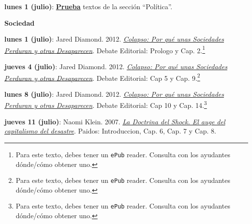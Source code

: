\documentclass[letterpaper]{article}
\renewenvironment{itemize}{
  \begin{list}{}{
    \setlength{\leftmargin}{1.5em}
  }
}{
  \end{list}
}
\begin{document}
\begin{enumerate}
\begin{itemize}
    \vspace{0.4cm}

		\item[\Pointinghand] {\bf lunes 1 (julio)}: {\bf \underline{Prueba}} textos de la secci\'on ``Pol\'itica''.
 
    \end{itemize}

\item {\bf Sociedad}

\begin{itemize}
		
		\item {\bf lunes 1 (julio)}: Jared Diamond. 2012. \href{https://github.com/hbahamonde/Intro_Ciencias_Sociales/raw/master/Readings/Diamond_Colapso_sociedades_perduran_desaparecen.epub}{\emph{Colapso: Por qu\'e unas Sociedades Perduran y otras Desaparecen}}. Debate Editorial: Prologo y Cap. 2.\footnote{Para este texto, debes tener un {\color{blue}\texttt{ePub}} reader. Consulta con los ayudantes d\'onde/c\'omo obtener uno.}

    \vspace{0.2cm}


		\item {\bf jueves 4 (julio)}: Jared Diamond. 2012. \href{https://github.com/hbahamonde/Intro_Ciencias_Sociales/raw/master/Readings/Diamond_Colapso_sociedades_perduran_desaparecen.epub}{\emph{Colapso: Por qu\'e unas Sociedades Perduran y otras Desaparecen}}. Debate Editorial: Cap 5 y Cap. 9.\footnote{Para este texto, debes tener un {\color{blue}\texttt{ePub}} reader. Consulta con los ayudantes d\'onde/c\'omo obtener uno.}

    \vspace{0.2cm}

		\item {\bf lunes 8 (julio)}: Jared Diamond. 2012. \href{https://github.com/hbahamonde/Intro_Ciencias_Sociales/raw/master/Readings/Diamond_Colapso_sociedades_perduran_desaparecen.epub}{\emph{Colapso: Por qu\'e unas Sociedades Perduran y otras Desaparecen}}. Debate Editorial: Cap 10 y Cap. 14.\footnote{Para este texto, debes tener un {\color{blue}\texttt{ePub}} reader. Consulta con los ayudantes d\'onde/c\'omo obtener uno.}

    \vspace{0.2cm}

		\item {\bf jueves 11 (julio)}: Naomi Klein. 2007. \href{https://github.com/hbahamonde/Intro_Ciencias_Sociales/raw/master/Readings/Shock_Klein.pdf}{\emph{La Doctrina del Shock. El auge del capitalismo del desastre}}. Paidos: Introduccion, Cap. 6, Cap. 7 y Cap. 8.


\end{itemize}
\end{enumerate}
\end{document}
